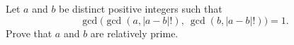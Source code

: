 Let $a$ and $b$ be distinct positive integers such that
\[\gcd\bigl(\gcd(a,|a-b|!),\ \gcd(b,|a-b|!)\bigr)=1 .\]
Prove that $a$ and $b$ are relatively prime.
